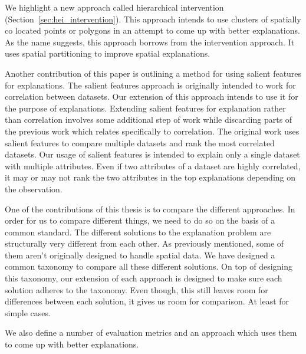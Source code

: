 We highlight a new approach called hierarchical intervention (Section~\ref{sec:hei_intervention}). This approach intends to use clusters of spatially co located points or polygons in an attempt to come up with better explanations. As the name suggests, this approach borrows from the intervention approach. It uses spatial partitioning to improve spatial explanations.

Another contribution of this paper is outlining a method for using salient features for explanations. The salient features approach is originally intended to work for correlation between datasets. Our extension of this approach intends to use it for the purpose of explanations. Extending salient features for explanation rather than correlation involves some additional step of work while discarding parts of the previous work which relates specifically to correlation. The original work uses salient features to compare multiple datasets and rank the most correlated datasets. Our usage of salient features is intended to explain only a single dataset with multiple attributes. Even if two attributes of a dataset are highly correlated, it may or may not rank the two attributes in the top explanations depending on the observation.

One of the contributions of this thesis is to compare the different approaches. In order for us to compare different things, we need to do so on the basis of a common standard. The different solutions to the explanation problem are structurally very different from each other. As previously mentioned, some of them aren't originally designed to handle spatial data. We have designed a common taxonomy to compare all these different solutions. On top of designing this taxonomy, our extension of each approach is designed to make sure each solution adheres to the taxonomy. Even though, this still leaves room for differences between each solution, it gives us room for comparison. At least for simple cases.

We also define a number of evaluation metrics and an approach which uses them to come up with better explanations.